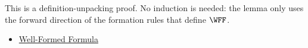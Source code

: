 \begin{remark*}
This is a definition-unpacking proof. No induction is needed: the lemma only
uses the forward direction of the formation rules that define \(\WFF\).
\end{remark*}

\begin{dependencies}
\begin{itemize}
  \item \hyperref[def:well-formed-formula]{Well-Formed Formula}
\end{itemize}
\end{dependencies}

\clearpage

